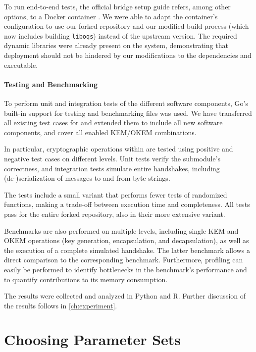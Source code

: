 To run end-to-end tests, the official bridge setup guide \cite{tor-bridge-setup} refers, among other options, to a Docker container \cite{tor-bridge-docker}.
We were able to adapt the container's configuration to use our forked repository and our modified build process (which now includes building \texttt{liboqs}) instead of the upstream version. The required dynamic libraries were already present on the system, demonstrating that deployment should not be hindered by our modifications to the dependencies and executable.

\paragraph{Testing and Benchmarking}

To perform unit and integration tests of the different software components, Go's built-in support for testing and benchmarking files was used. We have transferred all existing test cases for \obfsfour{} and extended them to include all new software components, and cover all enabled KEM/OKEM combinations.

In particular, cryptographic operations within \drivel{} are tested using positive and negative test cases on different levels. Unit tests verify the submodule's correctness, and integration tests simulate entire handshakes, including (de-)serialization of messages to and from byte strings.

The tests include a small variant that performs fewer tests of randomized functions, making a trade-off between execution time and completeness. All tests pass for the entire forked repository, also in their more extensive variant.

Benchmarks are also performed on multiple levels, including single KEM and OKEM operations (key generation, encapsulation, and decapsulation), as well as the execution of a complete simulated handshake. The latter benchmark allows a direct comparison to the corresponding \obfsfour{} benchmark. Furthermore, profiling can easily be performed to identify bottlenecks in the benchmark's performance and to quantify contributions to its memory consumption.

The results were collected and analyzed in Python and R.
Further discussion of the results follows in \cref{ch:experiment}.

\section{Choosing Parameter Sets} \label{sec:parameters}

